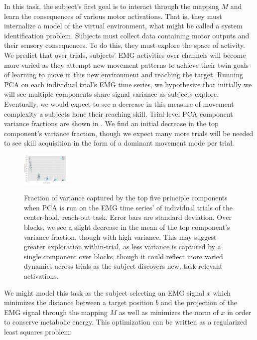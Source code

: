 \documentclass[../main.tex]{subfiles}
\begin{document}
In this task, the subject's first goal is to interact through the mapping $M$ and learn the consequences of various motor activations. That is, they must internalize a model of the virtual environment, what might be called a system identification problem. Subjects must collect data containing motor outputs and their sensory consequences. To do this, they must explore the space of activity. We predict that over trials, subjects' EMG activities over channels will become more varied as they attempt new movement patterns to achieve their twin goals of learning to move in this new environment and reaching the target. Running PCA on each individual trial's EMG time series, we hypothesize that initially we will see multiple components share signal variance as subjects explore. Eventually, we would expect to see a decrease in this measure of movement complexity a subjects hone their reaching skill. Trial-level PCA component variance fractions are shown in . We find an initial decrease in the top component's variance fraction, though we expect many more trials will be needed to see skill acquisition in the form of a dominant movement mode per trial.

\begin{figure}
\label{fig:PCA_trial_variance}
\centering
\includegraphics[width=0.2\textwidth]{images/data_analysis/center_hold/PCA_trial_variance.pdf}
\caption{Fraction of variance captured by the top five principle components when PCA is run on the EMG time series' of individual trials of the center-hold, reach-out task. Error bars are standard deviation. Over blocks, we see a slight decrease in the mean of the top component's variance fraction, though with high variance. This may suggest greater exploration within-trial, as less variance is captured by a single component over blocks, though it could reflect more varied dynamics across trials as the subject discovers new, task-relevant activations.}\label{fig:PCA_trial_variance}
\end{figure}

We might model this task as the subject selecting an EMG signal $x$ which minimizes the distance between a target position $b$ and the projection of the EMG signal through the mapping $M$ as well as minimizes the norm of $x$ in order to conserve metabolic energy. This optimization can be written as a regularized least squares problem:
\end{document}
